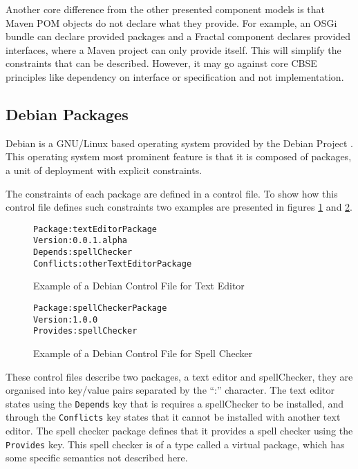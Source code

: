 Another core difference from the other presented component models is that Maven POM objects do not declare what they provide.
For example, an OSGi bundle can declare provided packages and a Fractal component declares provided interfaces, where a Maven project can only provide itself.
This will simplify the constraints that can be described. 
However, it may go against core CBSE principles like dependency on interface or specification \citep{Szyperski2002} and not implementation.

\subsection{Debian Packages}
\label{background.debianPackages}
Debian is a GNU/Linux based operating system provided by the Debian Project \citep{Barth2005}.
This operating system most prominent feature is that it is composed of packages, a unit of deployment with explicit constraints.

The constraints of each package are defined in a control file.
To show how this control file defines such constraints two examples are presented in figures \ref{debianmetadatate} and \ref{debianmetadatasc}.

\begin{figure}[htp]
\begin{center}
\begin{alltt}
Package: textEditorPackage
Version: 0.0.1.alpha
Depends: spellChecker
Conflicts: otherTextEditorPackage
\end{alltt}
  \caption[Debian Control file for Text Editor]{Example of a Debian Control File for Text Editor}
  \label{debianmetadatate}
\end{center}
\end{figure}

\begin{figure}[htp]
\begin{center}
\begin{alltt}
Package: spellCheckerPackage
Version: 1.0.0
Provides: spellChecker
\end{alltt}
  \caption[Debian Control files for Spell Checker]{Example of a Debian Control File for Spell Checker}
  \label{debianmetadatasc}
\end{center}
\end{figure}

These control files describe two packages, a text editor and spellChecker, they are organised into key/value pairs separated by the ``:'' character.
The text editor states using the \texttt{Depends} key that is requires a spellChecker to be installed, 
and through the \texttt{Conflicts} key states that it cannot be installed with another text editor.
The spell checker package defines that it provides a spell checker using the \texttt{Provides} key.
This spell checker is of a type called a virtual package, which has some specific semantics not described here.

